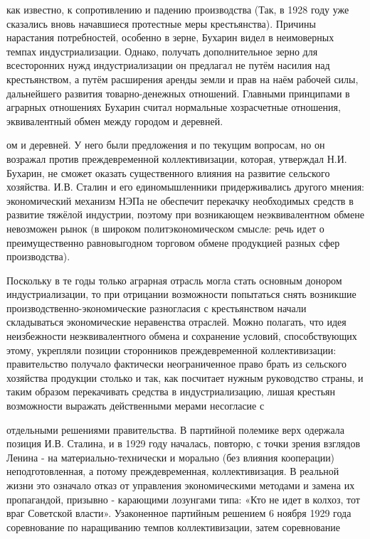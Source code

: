\label{112-1}
как известно, к сопротивлению и падению производства (Так, в 1928 году уже сказались вновь начавшиеся протестные меры крестьянства). Причины нарастания потребностей, особенно в зерне, Бухарин видел в неимоверных темпах индустриализации. Однако, получать дополнительное зерно для всесторонних нужд индустриализации он предлагал не путём насилия над крестьянством, а путём расширения аренды земли и прав на наём рабочей силы, дальнейшего развития товарно-денежных отношений. Главными принципами в аграрных отношениях Бухарин считал нормальные хозрасчетные отношения, эквивалентный обмен между городом и деревней.

\label{113-1}
ом и деревней. У него были предложения и по текущим вопросам, но он возражал против преждевременной коллективизации, которая, утверждал Н.И. Бухарин, не сможет оказать существенного влияния на развитие сельского хозяйства. И.В. Сталин и его единомышленники придерживались другого мнения: экономический механизм НЭПа не обеспечит перекачку необходимых средств в развитие тяжёлой индустрии, поэтому при возникающем неэквивалентном обмене невозможен рынок (в широком политэкономическом смысле: речь идет о преимущественно равновыгодном торговом обмене продукцией разных сфер производства).

\label{114-1}
Поскольку в те годы только аграрная отрасль могла стать основным донором индустриализации, то при отрицании возможности попытаться снять возникшие производственно-экономические разногласия с крестьянством начали складываться экономические неравенства отраслей. Можно полагать, что идея неизбежности неэквивалентного обмена и сохранение условий, способствующих этому, укрепляли позиции сторонников преждевременной коллективизации: правительство получало фактически неограниченное право брать из сельского хозяйства продукции столько и так, как посчитает нужным руководство страны, и таким образом перекачивать средства в индустриализацию, лишая крестьян возможности выражать действенными мерами несогласие с

\label{115-1}
отдельными решениями правительства. В партийной полемике верх одержала позиция И.В. Сталина, и в 1929 году началась, повторю, с точки зрения взглядов Ленина - на материально-технически и морально (без влияния кооперации) неподготовленная, а потому преждевременная, коллективизация. В реальной жизни это означало отказ от управления экономическими методами и замена их пропагандой, призывно - карающими лозунгами типа: «Кто не идет в колхоз, тот враг Советской власти». Узаконенное партийным решением 6 ноября 1929 года соревнование по наращиванию темпов коллективизации, затем соревнование 


